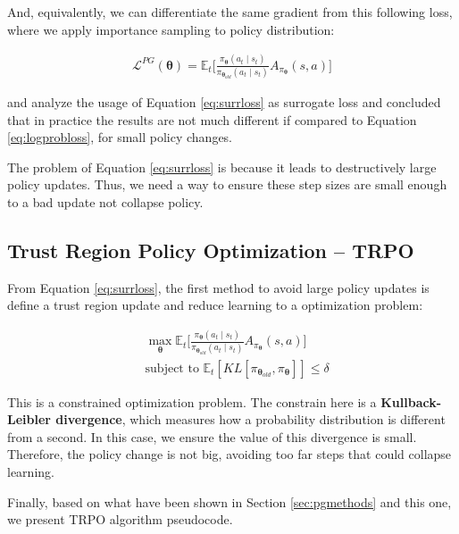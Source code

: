 And, equivalently, we can differentiate the same gradient from this following loss, where we apply importance sampling to policy distribution:

\begin{eqnarray}\label{eq:surrloss}
\mathcal{L}^{PG}(\boldsymbol{\theta}) = \mathbb{E}_{t}\Big[\frac{\pi_{\boldsymbol{\theta}}(a_{t} \mid s_{t})}{\pi_{\boldsymbol{\theta}_{old}}(a_{t} \mid s_{t})}A_{\pi_{\boldsymbol{\theta}}}(s,a)\Big]
\end{eqnarray}

\cite{trpo} and \cite{Kakade02approximatelyoptimal} analyze the usage of Equation \ref{eq:surrloss} as surrogate loss and concluded that in practice the results are not much different if compared to Equation \ref{eq:logprobloss}, for small policy changes.

The problem of Equation \ref{eq:surrloss} is because it leads to destructively large policy updates. Thus, we need a way to ensure these step sizes are small enough to a bad update not collapse policy.
\subsection{Trust Region Policy Optimization -- TRPO}

From Equation \ref{eq:surrloss}, the first method to avoid large policy updates is define a trust region update and reduce learning to a optimization problem:

\begin{align}\label{eq:tr}
&  \max_{\boldsymbol{\theta}}  \mathbb{E}_{t}\Big[\frac{\pi_{\boldsymbol{\theta}}(a_{t} \mid s_{t})}{\pi_{\boldsymbol{\theta}_{old}}(a_{t} \mid s_{t})}A_{\pi_{\boldsymbol{\theta}}}(s,a)\Big]\\ &  \text{subject to }  \mathbb{E}_{t}[KL[\pi_{\boldsymbol{\theta}_{old}}, \pi_{\boldsymbol{\theta}}]] \leq \delta \nonumber
\end{align}

This is a constrained optimization problem. The constrain here is a \textbf{Kullback-Leibler divergence}, which measures how a probability distribution is different from a second. In this case, we ensure the value of this divergence is small. Therefore, the policy change is not big, avoiding too far steps that could collapse learning.

Finally, based on what have been shown in Section \ref{sec:pgmethods} and this one, we present TRPO algorithm pseudocode.


